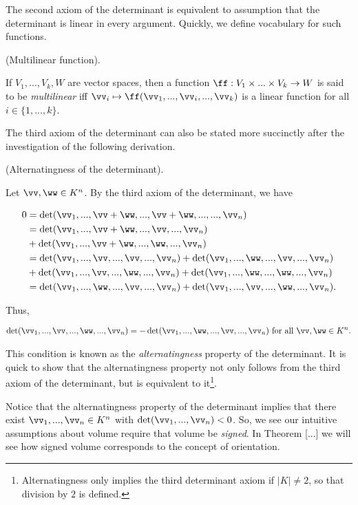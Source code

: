 The second axiom of the determinant is equivalent to assumption that the determinant is linear in every argument. Quickly, we define vocabulary for such functions.

\begin{defn}
    (Multilinear function).

    If $V_1, ..., V_k, W$ are vector spaces, then a function $\ff:V_1 \times ... \times V_k \rightarrow W$ is said to be \textit{multilinear} iff $\vv_i \mapsto \ff(\vv_1, ..., \vv_i, ..., \vv_k)$ is a linear function for all $i \in \{1, ..., k\}$.
\end{defn}

The third axiom of the determinant can also be stated more succinctly after the investigation of the following derivation.

\begin{deriv}
    (Alternatingness of the determinant).

    Let $\vv, \ww \in K^n$. By the third axiom of the determinant, we have 

    \begin{align*}
        0 &= \det(\vv_1, ..., \vv + \ww, ..., \vv + \ww, ..., ..., \vv_n) \\
        &= \det(\vv_1, ..., \vv + \ww, ..., \vv, ..., \vv_n) \\
        &+ \det(\vv_1, ..., \vv + \ww, ..., \ww, ..., \vv_n) \\
        &= \det(\vv_1, ..., \vv, ..., \vv, ..., \vv_n) + \det(\vv_1, ..., \ww, ..., \vv, ..., \vv_n) \\
        &+ \det(\vv_1, ..., \vv, ..., \ww, ..., \vv_n)+ \det(\vv_1, ..., \ww, ..., \ww, ..., \vv_n) \\
        &= \det(\vv_1, ..., \ww, ..., \vv, ..., \vv_n) + \det(\vv_1, ..., \vv, ..., \ww, ..., \vv_n).
    \end{align*}
    
    Thus,

    \begin{align*}
        \det(\vv_1, ..., \vv, ..., \ww, ..., \vv_n) = -\det(\vv_1, ..., \ww, ..., \vv, ..., \vv_n) \text{ for all $\vv, \ww \in K^n$}.
    \end{align*}

    This condition is known as the \textit{alternatingness} property of the determinant. It is quick to show that the alternatingness property not only follows from the third axiom of the determinant, but is equivalent to it\footnote{Alternatingness only implies the third determinant axiom if $|K| \neq 2$, so that division by $2$ is defined.}. 

    Notice that the alternatingness property of the determinant implies that there exist $\vv_1, ..., \vv_n \in K^n$ with $\det(\vv_1, ..., \vv_n) < 0$. So, we see our intuitive assumptions about volume require that volume be \textit{signed}. In Theorem [...] we will see how signed volume corresponds to the concept of orientation.
\end{deriv}

